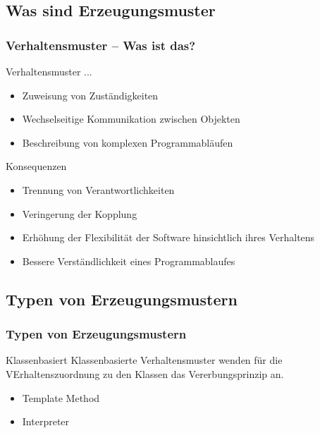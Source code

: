 \subsection{Was sind Erzeugungsmuster}
\begin{frame}
	\frametitle{Verhaltensmuster -- Was ist das?}
	\begin{block}{Verhaltensmuster ...}
	\begin{itemize}
		\item Zuweisung von Zuständigkeiten
		\item Wechselseitige Kommunikation zwischen Objekten
		\item Beschreibung von komplexen Programmabläufen
	\end{itemize}
	\end{block}	
	\begin{block}{Konsequenzen}
	\begin{itemize}
		\item Trennung von Verantwortlichkeiten
		\item Veringerung der Kopplung 
		\item Erhöhung der Flexibilität der Software hinsichtlich ihres Verhaltens
		\item Bessere Verständlichkeit eines Programmablaufes
	\end{itemize}
	\end{block}	
\end{frame}

\subsection{Typen von Erzeugungsmustern}
\begin{frame}
	\frametitle{Typen von Erzeugungsmustern}
	\begin{block}{Klassenbasiert}
		Klassenbasierte Verhaltensmuster wenden für die VErhaltenszuordnung zu den Klassen das Vererbungsprinzip an. 
		\begin{itemize}
			\item Template Method
			\item Interpreter
		\end{itemize} 	
	\end{block}

	
\end{frame}


